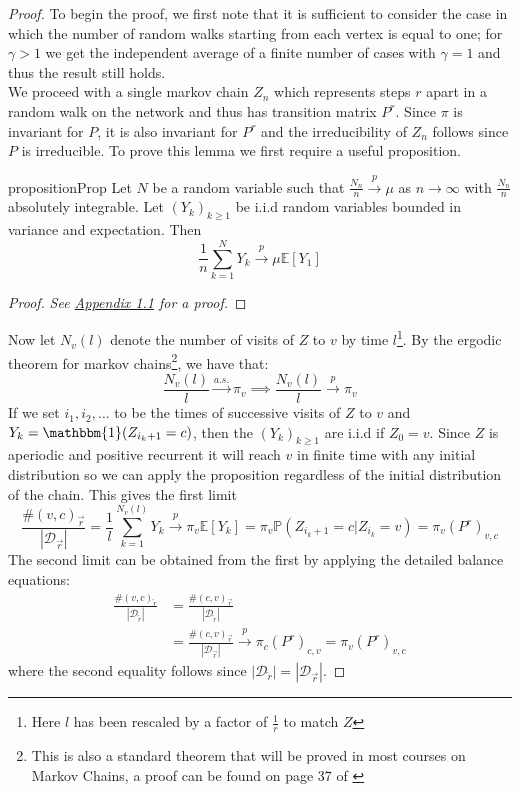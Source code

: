 \documentclass[a4paper]{article}
\renewcommand{\P}{\mathbb P}
\renewcommand{\E}{\mathbb E}
\newcommand{\D}{\mathcal D}
\newcommand{\rar}{\overrightarrow r}
\newcommand{\lar}{\overleftarrow r}
\begin{document}
\begin{proof}
To begin the proof, we first note that it is sufficient to consider the case in which the number
of random walks starting from each vertex is equal to one; for $\gamma > 1$ we get the independent average of
a finite number of cases with $\gamma = 1$ and thus the result still holds.\\
We proceed with a single markov chain $Z_n$ which represents steps $r$ apart
in a random walk on the network and thus has transition matrix $P^r$. Since $\pi$ is invariant for $P$, it is also invariant for $P^r$ and the irreducibility of $Z_n$
follows since $P$ is irreducible. To prove this lemma we first require a useful proposition.
\begin{restatable}{proposition}{Prop}
  Let $N$ be a random variable such that $\frac{N_n}{n} \overset{p}{\longrightarrow} \mu$ as $n \to \infty$ with $\frac{N_n}{n}$ absolutely integrable. Let $(Y_k)_{k \geq 1}$ be i.i.d random variables bounded in variance and expectation. Then
  \[\frac{1}{n}\sum_{k=1}^N Y_k \overset{p}{\longrightarrow} \mu\E[Y_1]\]
\end{restatable}
\begin{proof}\renewcommand{\qedsymbol}{}
  \textit{See \hyperref[sec:appendix]{Appendix 1.1} for a proof.}
\end{proof}
\noindent Now let $N_v(l)$ denote the number of visits of $Z$ to $v$ by time $l$\footnote{Here $l$ has been rescaled by a factor of $\frac{1}{r}$ to match $Z$}.
By the ergodic theorem for markov chains\footnote{This is also a standard theorem that will be proved in most courses on Markov Chains, a proof can be found on page 37 of \cite{markov_chains_alt}}, we have that:
\[\frac{N_v(l)}{l} \overset{a.s.}{\longrightarrow} \pi_v \implies \frac{N_v(l)}{l} \overset{p}{\longrightarrow} \pi_v\]
If we set $i_1, i_2, \dots$ to be the times of successive visits of $Z$ to $v$ and $Y_k = \mathbbm{1}(Z_{i_k+1} = c)$, then the $(Y_k)_{k \geq 1}$ are i.i.d if $Z_0 = v$. Since $Z$ is aperiodic and positive recurrent it will reach $v$ in finite time with any initial distribution so we can apply the proposition regardless of the initial distribution of the chain.
This gives the first limit
\[\frac{\#(v, c)_{\rar}}{|\D_{\rar}|} = \frac{1}{l}\sum_{k = 1}^{N_v(l)} Y_k \overset{p}{\longrightarrow} \pi_v \E[Y_k] = \pi_v\P(Z_{i_k + 1} = c | Z_{i_k} = v) = \pi_v(P^r)_{v,c}\]
The second limit can be obtained from the first by applying the detailed balance equations:
\begin{align*}
\frac{\#(v, c)_{\lar}}{|\D_{\lar}|} &= \frac{\#(c, v)_{\rar}}{|\D_{\lar}|}\\
&=\frac{\#(c, v)_{\rar}}{|\D_{\rar}|} \overset{p}{\longrightarrow} \pi_c(P^r)_{c,v} = \pi_v (P^r)_{v,c}
\end{align*}
where the second equality follows since $|\D_{\lar}| = |\D_{\rar}|$.
\end{proof}
\end{document}
